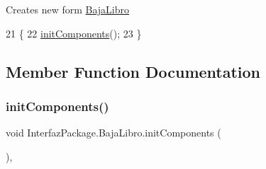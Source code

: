 Creates new form \mbox{\hyperlink{class_interfaz_package_1_1_baja_libro}{Baja\+Libro}} 
\begin{DoxyCode}
21                        \{
22         \mbox{\hyperlink{class_interfaz_package_1_1_baja_libro_addc7b5927a42ad6e51cf8b576df6533d}{initComponents}}();
23     \}
\end{DoxyCode}


\subsection{Member Function Documentation}
\mbox{\label{class_interfaz_package_1_1_baja_libro_addc7b5927a42ad6e51cf8b576df6533d}} 
\subsubsection{\texorpdfstring{init\+Components()}{initComponents()}}
{\footnotesize\ttfamily void Interfaz\+Package.\+Baja\+Libro.\+init\+Components (\begin{DoxyParamCaption}{ }\end{DoxyParamCaption})\hspace{0.3cm}{\ttfamily [inline]}, {\ttfamily [private]}}


